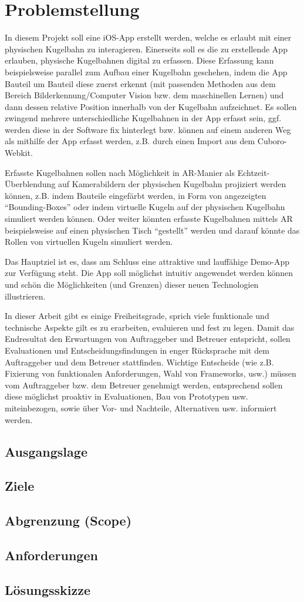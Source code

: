 \section{Problemstellung}
In diesem Projekt soll eine iOS-App erstellt werden, welche es erlaubt mit einer physischen Kugelbahn zu interagieren. Einerseits soll es die zu erstellende App erlauben, physische Kugelbahnen digital zu erfassen. Diese Erfassung kann beispielsweise parallel zum Aufbau einer Kugelbahn geschehen, indem die App Bauteil um Bauteil diese zuerst erkennt (mit passenden Methoden aus dem Bereich Bilderkennung/Computer Vision bzw. dem maschinellen Lernen) und dann dessen relative Position innerhalb von der Kugelbahn aufzeichnet. Es sollen zwingend mehrere unterschiedliche Kugelbahnen in der App erfasst sein, ggf. werden diese in der Software fix hinterlegt bzw. können auf einem anderen Weg als mithilfe der App erfasst werden, z.B. durch einen Import aus dem Cuboro-Webkit.


Erfasste Kugelbahnen sollen nach Möglichkeit in AR-Manier als Echtzeit-Überblendung auf Kamerabildern der physischen Kugelbahn projiziert werden können, z.B. indem Bauteile eingefärbt werden, in Form von angezeigten "`Bounding-Boxes"' oder indem virtuelle Kugeln auf der physischen Kugelbahn simuliert werden können. Oder weiter könnten erfasste Kugelbahnen mittels AR beispielsweise auf einen physischen Tisch "`gestellt"' werden und darauf könnte das Rollen von virtuellen Kugeln simuliert werden. 


Das Hauptziel ist es, dass am Schluss eine attraktive und lauffähige Demo-App zur Verfügung steht. Die App soll möglichst intuitiv angewendet werden können und schön die Möglichkeiten (und Grenzen) dieser neuen Technologien illustrieren.


In dieser Arbeit gibt es einige Freiheitsgrade, sprich viele funktionale und technische Aspekte gilt es zu erarbeiten, evaluieren und fest zu legen. Damit das Endresultat den Erwartungen von Auftraggeber und Betreuer entspricht, sollen Evaluationen und Entscheidungsfindungen in enger Rücksprache mit dem Auftraggeber und dem Betreuer stattfinden. Wichtige Entscheide (wie z.B. Fixierung von funktionalen Anforderungen, Wahl von Frameworks, usw.) müssen vom Auftraggeber bzw. dem Betreuer genehmigt werden, entsprechend sollen diese möglichst proaktiv in Evaluationen, Bau von Prototypen usw. miteinbezogen, sowie über Vor- und Nachteile, Alternativen usw. informiert werden.

\subsection{Ausgangslage}
\subsection{Ziele}
\subsection{Abgrenzung (Scope)}
\subsection{Anforderungen}
\subsection{Lösungsskizze}
